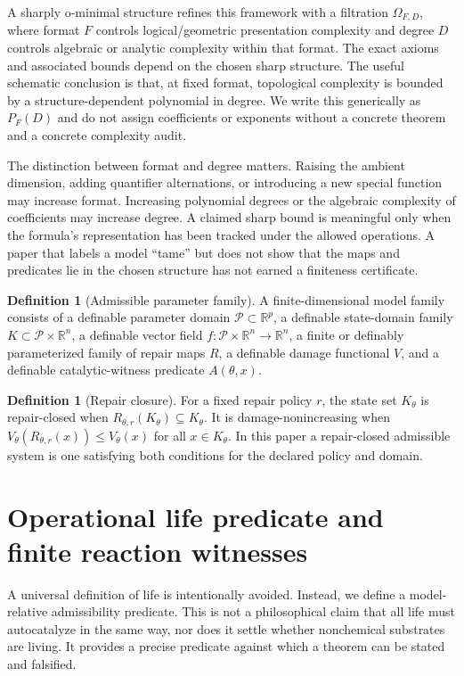 \documentclass[11pt,a4paper]{article}
\theoremstyle{definition}
\newtheorem{definition}[theorem]{Definition}
\theoremstyle{remark}
\newcommand{\R}{\mathbb{R}}
\newcommand{\ThetaSet}{\mathcal{P}}
\begin{document}
A sharply o-minimal structure refines this framework with a filtration \(\Omega_{F,D}\), where format \(F\) controls logical/geometric presentation complexity and degree \(D\) controls algebraic or analytic complexity within that format. The exact axioms and associated bounds depend on the chosen sharp structure. The useful schematic conclusion is that, at fixed format, topological complexity is bounded by a structure-dependent polynomial in degree. We write this generically as \(P_F(D)\) and do not assign coefficients or exponents without a concrete theorem and a concrete complexity audit.

The distinction between format and degree matters. Raising the ambient dimension, adding quantifier alternations, or introducing a new special function may increase format. Increasing polynomial degrees or the algebraic complexity of coefficients may increase degree. A claimed sharp bound is meaningful only when the formula's representation has been tracked under the allowed operations. A paper that labels a model ``tame'' but does not show that the maps and predicates lie in the chosen structure has not earned a finiteness certificate.

\begin{definition}[Admissible parameter family]
A finite-dimensional model family consists of a definable parameter domain \(\ThetaSet\subset\R^p\), a definable state-domain family \(K\subset\ThetaSet\times\R^n\), a definable vector field \(f:\ThetaSet\times\R^n\to\R^n\), a finite or definably parameterized family of repair maps \(R\), a definable damage functional \(V\), and a definable catalytic-witness predicate \(A(\theta,x)\).
\end{definition}

\begin{definition}[Repair closure]
For a fixed repair policy \(r\), the state set \(K_\theta\) is repair-closed when \(R_{\theta,r}(K_\theta)\subseteq K_\theta\). It is damage-nonincreasing when \(V_\theta(R_{\theta,r}(x))\leq V_\theta(x)\) for all \(x\in K_\theta\). In this paper a repair-closed admissible system is one satisfying both conditions for the declared policy and domain.
\end{definition}

\section{Operational life predicate and finite reaction witnesses}
A universal definition of life is intentionally avoided. Instead, we define a model-relative admissibility predicate. This is not a philosophical claim that all life must autocatalyze in the same way, nor does it settle whether nonchemical substrates are living. It provides a precise predicate against which a theorem can be stated and falsified.
\end{document}
